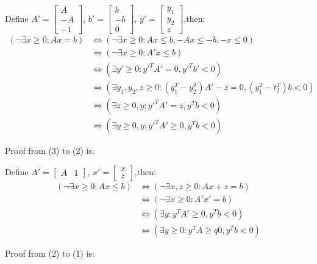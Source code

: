 \documentclass[11pt,a4paper,oneside]{article}
\newcommand{\y}{\mathbf{y}}
\newcommand{\z}{\mathbf{z}}
\begin{document}
\begin{problem}{1}
	Define $A'=\begin{bmatrix}A\\-A\\-1\end{bmatrix}$,
	$b'=\begin{bmatrix}b\\-b\\0\end{bmatrix}$,
	$y'=\begin{bmatrix}y_1\\y_2\\z\end{bmatrix}$,then:
	\begin{align*}
	(\neg\exists x\geq 0:Ax=b)
	& \Longleftrightarrow (\neg\exists x\geq 0:Ax\leq b,-Ax\leq -b,-x\leq 0)\\
	& \Longleftrightarrow (\neg\exists x\geq 0:A'x\leq b)\\
	& \Longleftrightarrow (\exists y'\geq 0:y'^TA'=0,y'^Tb'<0)\\
	& \Longleftrightarrow (\exists y_1,y_2,z\geq 0:(y_1^T-y_2^T)A'-z=0,(y_1^T-t_2^T)b<0)\\
	& \Longleftrightarrow (\exists z\geq 0,y:y'^TA'=z,y^Tb<0)\\
	& \Longleftrightarrow (\exists y\geq 0,y:y'^TA'\geq 0,y^Tb<0)	
	\end{align*}
	
	Proof from (3) to (2) is:
	
	Define $A'=\begin{bmatrix}A & 1\end{bmatrix}$,
	$x'=\begin{bmatrix}x\\z\end{bmatrix}$,then:
	\begin{align*}
	(\neg\exists x\geq 0:Ax\leq b)
	& \Longleftrightarrow (\neg\exists x,z\geq 0:Ax+z=b)\\
	& \Longleftrightarrow (\neg\exists x\geq 0:A'x'=b)\\
	& \Longleftrightarrow (\exists y:y^TA'\geq 0,y^Tb<0)\\
	& \Longleftrightarrow (\exists y\geq 0:y^TA\geq q0,y^Tb<0)
	\end{align*}
	
	Proof from (2) to (1) is:
	

\end{problem}
\end{document}
